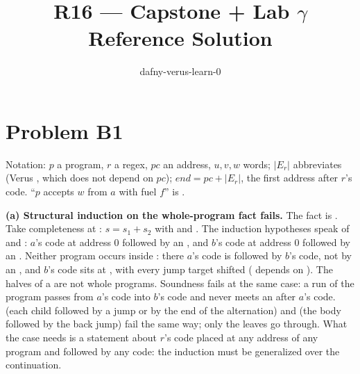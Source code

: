 \documentclass[11pt]{article}
\title{R16 --- Capstone + Lab $\gamma$ \\ \large Reference Solution}
\author{dafny-verus-learn-0}
\date{}
\begin{document}
\maketitle
\sloppy
\section*{Problem B1}\label{ans:B1}
\begin{answer}
Notation: $p$ a program, $r$ a regex, $pc$ an address, $u, v, w$ words;
$|E_r|$ abbreviates  (Verus , which does not
depend on $pc$); $\mathit{end} = pc + |E_r|$, the first address after $r$'s
code. ``$p$ accepts $w$ from $a$ with fuel $f$'' is .

\textbf{(a) Structural induction on the whole-program fact fails.} The fact is
. Take completeness at
: $s = s_1 + s_2$ with  and
. The induction hypotheses speak of  and
: $a$'s code at address 0 followed by an , and
$b$'s code at address 0 followed by an . Neither program occurs
inside : there $a$'s code is followed by $b$'s code,
not by an , and $b$'s code sits at , with every
jump target shifted ( depends on ). The halves of a
 are not whole programs. Soundness fails at the same case: a run of
the  program passes from $a$'s code into $b$'s code and never meets an
 after $a$'s code.  (each child followed by a jump or by
the end of the alternation) and  (the body followed by the back
jump) fail the same way; only the leaves go through. What the case needs is a
statement about $r$'s code placed at any address of any program and followed
by any code: the induction must be generalized over the continuation.


\end{answer}
\end{document}
